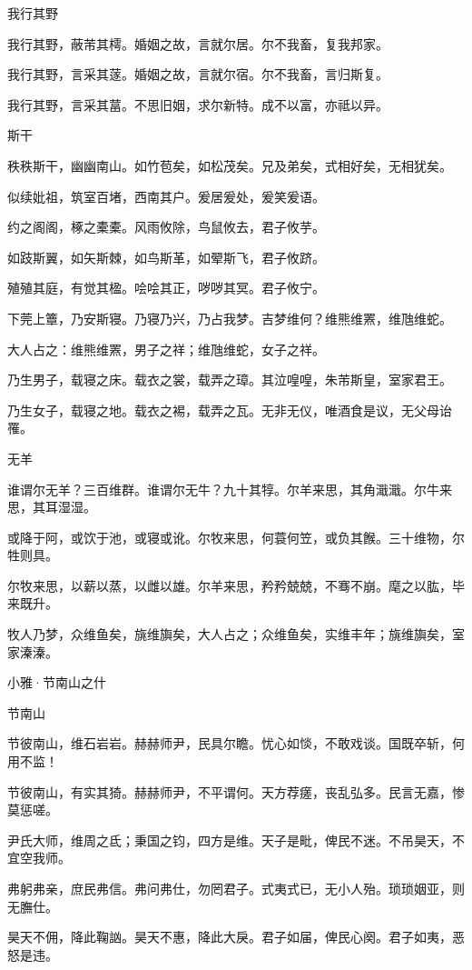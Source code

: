 我行其野

我行其野，蔽芾其樗。婚姻之故，言就尔居。尔不我畜，复我邦家。

我行其野，言采其蓫。婚姻之故，言就尔宿。尔不我畜，言归斯复。

我行其野，言采其葍。不思旧姻，求尔新特。成不以富，亦祗以异。

斯干

秩秩斯干，幽幽南山。如竹苞矣，如松茂矣。兄及弟矣，式相好矣，无相犹矣。

似续妣祖，筑室百堵，西南其户。爰居爰处，爰笑爰语。

约之阁阁，椓之橐橐。风雨攸除，鸟鼠攸去，君子攸芋。

如跂斯翼，如矢斯棘，如鸟斯革，如翚斯飞，君子攸跻。

殖殖其庭，有觉其楹。哙哙其正，哕哕其冥。君子攸宁。

下莞上簟，乃安斯寝。乃寝乃兴，乃占我梦。吉梦维何？维熊维罴，维虺维蛇。

大人占之：维熊维罴，男子之祥；维虺维蛇，女子之祥。

乃生男子，载寝之床。载衣之裳，载弄之璋。其泣喤喤，朱芾斯皇，室家君王。

乃生女子，载寝之地。载衣之裼，载弄之瓦。无非无仪，唯酒食是议，无父母诒罹。

无羊

谁谓尔无羊？三百维群。谁谓尔无牛？九十其犉。尔羊来思，其角濈濈。尔牛来思，其耳湿湿。

或降于阿，或饮于池，或寝或讹。尔牧来思，何蓑何笠，或负其餱。三十维物，尔牲则具。

尔牧来思，以薪以蒸，以雌以雄。尔羊来思，矜矜兢兢，不骞不崩。麾之以肱，毕来既升。

牧人乃梦，众维鱼矣，旐维旟矣，大人占之；众维鱼矣，实维丰年；旐维旟矣，室家溱溱。




小雅·节南山之什


节南山

节彼南山，维石岩岩。赫赫师尹，民具尔瞻。忧心如惔，不敢戏谈。国既卒斩，何用不监！

节彼南山，有实其猗。赫赫师尹，不平谓何。天方荐瘥，丧乱弘多。民言无嘉，惨莫惩嗟。

尹氏大师，维周之氐；秉国之钧，四方是维。天子是毗，俾民不迷。不吊昊天，不宜空我师。

弗躬弗亲，庶民弗信。弗问弗仕，勿罔君子。式夷式已，无小人殆。琐琐姻亚，则无膴仕。

昊天不佣，降此鞠訩。昊天不惠，降此大戾。君子如届，俾民心阕。君子如夷，恶怒是违。

